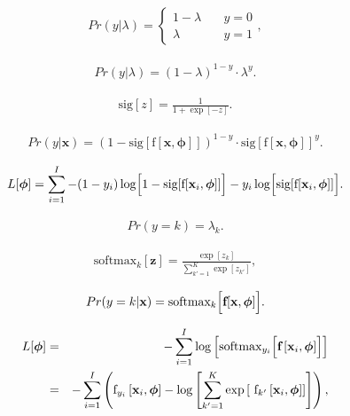 \documentclass[letterpaper,twoside,openany, titlepage,oldfontcommands,titles,dvipsnames]{memoir}
\begin{document}
\begin{eqnarray}
  Pr(y|\lambda) = \begin{cases} 1-\lambda & \quad y =0 \\ \lambda & \quad y= 1\end{cases},
 \end{eqnarray}

\begin{eqnarray}
  Pr(y|\lambda) = (1-\lambda)^{1-y}\cdot \lambda^{y}.
 \end{eqnarray}

\begin{eqnarray}\label{eq:logistic_sigmoid}
  \mbox{sig}[z] = \frac{1}{1+\exp[-z]}.
 \end{eqnarray}

\begin{eqnarray}\label{eq:loss_binary}
  Pr(y|\mathbf{x}) = (1-\mbox{sig}[\mbox{f}[\mathbf{x},\boldsymbol\phi]])^{1-y}\cdot \mbox{sig}[\mbox{f}[\mathbf{x},\boldsymbol\phi]]^y.
 \end{eqnarray}

\begin{eqnarray}\label{eq:loss_binary_cross_entropy}
 L[\boldsymbol\phi] = \sum_{i=1}^{I}-(1-y_{i})\log\Bigl[1-\mbox{sig}[\mbox{f}[\mathbf{x}_i,\boldsymbol\phi]]\Bigr] - y_{i}\log\Bigl[\mbox{sig}[\mbox{f}[\mathbf{x}_i,\boldsymbol\phi]]\Bigr].
 \end{eqnarray}

\begin{eqnarray}
 Pr(y=k) = \lambda_{k}.
 \end{eqnarray}

\begin{eqnarray}
 \mbox{softmax}_{k}[\mathbf{z}] = \frac{\exp[z_{k}]}{\sum_{k'=1}^{K}\exp[z_{k'}]},
 \end{eqnarray}

\begin{eqnarray}
  Pr(y=k|\mathbf{x}) = \mbox{softmax}_{k}\Bigr[\mbox{\bf f}[\mathbf{x},\boldsymbol\phi]\Bigl].
 \end{eqnarray}

\begin{eqnarray}\label{eq:loss_multiclass_class}
  L[\boldsymbol\phi] &=& -\sum_{i=1}^{I}\log\left[\mbox{softmax}_{y_{i}}\Bigl[\mbox{\bf f}\left[\mathbf{x}_i,\boldsymbol\phi\right]\Bigr]\right]\nonumber\\
  &=& -\sum_{i=1}^{I}\left(\mbox{f}_{y_{i}}\left[\mathbf{x}_i,\boldsymbol\phi\right]-\log\left[\sum_{k'=1}^{K}\exp\left[\mbox{ f}_{k'}\left[\mathbf{x}_i,\boldsymbol\phi\right]\right]\right]\right),
 \end{eqnarray}
\end{document}
